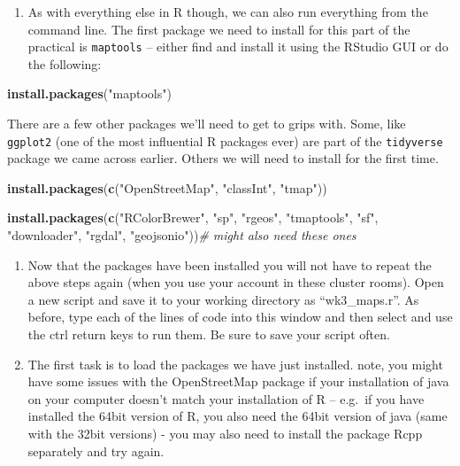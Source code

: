 \documentclass[]{book}
\newenvironment{Shaded}{\begin{snugshade}}{\end{snugshade}}
\newcommand{\CommentTok}[1]{\textcolor[rgb]{0.56,0.35,0.01}{\textit{#1}}}
\newcommand{\KeywordTok}[1]{\textcolor[rgb]{0.13,0.29,0.53}{\textbf{#1}}}
\newcommand{\NormalTok}[1]{#1}
\newcommand{\StringTok}[1]{\textcolor[rgb]{0.31,0.60,0.02}{#1}}
\providecommand{\tightlist}{%
  \setlength{\itemsep}{0pt}\setlength{\parskip}{0pt}}
\begin{document}
\begin{enumerate}
\def\labelenumi{\arabic{enumi}.}
\setcounter{enumi}{1}
\tightlist
\item
  As with everything else in R though, we can also run everything from the command line. The first package we need to install for this part of the practical is \texttt{maptools} -- either find and install it using the RStudio GUI or do the following:
\end{enumerate}

\begin{Shaded}
\begin{Highlighting}[]
\KeywordTok{install.packages}\NormalTok{(}\StringTok{"maptools"}\NormalTok{)}
\end{Highlighting}
\end{Shaded}

There are a few other packages we'll need to get to grips with. Some, like \texttt{ggplot2} (one of the most influential R packages ever) are part of the \texttt{tidyverse} package we came across earlier. Others we will need to install for the first time.

\begin{Shaded}
\begin{Highlighting}[]
\KeywordTok{install.packages}\NormalTok{(}\KeywordTok{c}\NormalTok{(}\StringTok{"OpenStreetMap"}\NormalTok{, }\StringTok{"classInt"}\NormalTok{, }\StringTok{"tmap"}\NormalTok{))}

\KeywordTok{install.packages}\NormalTok{(}\KeywordTok{c}\NormalTok{(}\StringTok{"RColorBrewer"}\NormalTok{, }\StringTok{"sp"}\NormalTok{, }\StringTok{"rgeos"}\NormalTok{, }\StringTok{"tmaptools"}\NormalTok{, }\StringTok{"sf"}\NormalTok{, }\StringTok{"downloader"}\NormalTok{, }\StringTok{"rgdal"}\NormalTok{, }\StringTok{"geojsonio"}\NormalTok{))}\CommentTok{# might also need these ones}
\end{Highlighting}
\end{Shaded}

\begin{enumerate}
\def\labelenumi{\arabic{enumi}.}
\setcounter{enumi}{3}
\item
  Now that the packages have been installed you will not have to repeat the above steps again (when you use your account in these cluster rooms). Open a new script and save it to your working directory as ``wk3\_maps.r''. As before, type each of the lines of code into this window and then select and use the ctrl return keys to run them. Be sure to save your script often.
\item
  The first task is to load the packages we have just installed. note, you might have some issues with the OpenStreetMap package if your installation of java on your computer doesn't match your installation of R -- e.g.~if you have installed the 64bit version of R, you also need the 64bit version of java (same with the 32bit versions) - you may also need to install the package Rcpp separately and try again.
\end{enumerate}
\end{document}
